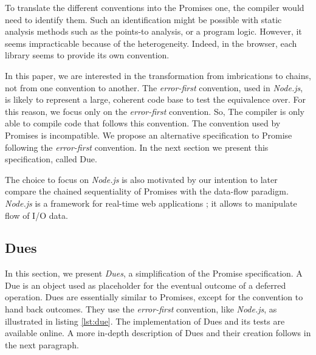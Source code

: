 To translate the different conventions into the Promises one, the compiler would need to identify them.
Such an identification might be possible with static analysis methods such as the points-to analysis\cite{Wei2014}, or a program logic\cite{Gardner2013,Bodin2014}.
However, it seems impracticable because of the heterogeneity.
Indeed, in the browser, each library seems to provide its own convention.

In this paper, we are interested in the transformation from imbrications to chains, not from one convention to another.
The \textit{error-first} convention, used in \textit{Node.js}, is likely to represent a large, coherent code base to test the equivalence over.
For this reason, we focus only on the \textit{error-first} convention.
So, The compiler is only able to compile code that follows this convention.
The convention used by Promises is incompatible.
We propose an alternative specification to Promise following the \textit{error-first} convention.
In the next section we present this specification, called Due.

The choice to focus on \textit{Node.js} is also motivated by our intention to later compare the chained sequentiality of Promises with the data-flow paradigm.
\textit{Node.js} is a framework for real-time web applications ; it allows to manipulate flow of I/O data.


\subsection{Dues} \label{section:definitions:due}

In this section, we present \textit{Dues}, a simplification of the Promise specification.
A Due is an object used as placeholder for the eventual outcome of a deferred operation.
Dues are essentially similar to Promises, except for the convention to hand back outcomes.
They use the \textit{error-first} convention, like \textit{Node.js}, as illustrated in listing \ref{lst:due}.
The implementation of Dues and its tests are available online.
A more in-depth description of Dues and their creation follows in the next paragraph.

